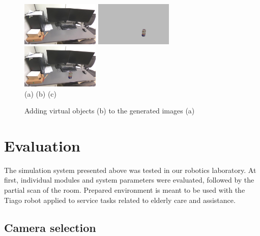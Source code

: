 \documentclass{svproc}
\begin{document}
\begin{figure}[!ht]
    \centering
        \includegraphics[width=0.33\textwidth,trim=29cm 2cm 0 10cm,clip]{img/gazebo_integration/sim.jpg}\hfill%
        \includegraphics[width=0.33\textwidth,trim=29cm 2cm 0 10cm,clip]{img/gazebo_integration/gazebo.jpg}\hfill%
        \includegraphics[width=0.33\textwidth,trim=29cm 2cm 0 10cm,clip]{img/gazebo_integration/sum.jpg}\\
        \hfill (a) \hfill\hfill (b) \hfill\hfill (c) \hfill~
    \caption{Adding virtual objects (b) to the generated images (a)}
    \label{fig:join}
    \vspace{-5mm}
\end{figure}


\section{Evaluation}
\label{sec:evaluation}

The simulation system presented above was tested in our robotics laboratory. At first, individual modules
and system parameters were evaluated, followed by the partial scan of the room. Prepared environment is 
meant to be used with the Tiago robot applied to service tasks related to elderly care and assistance.

\subsection{Camera selection}
\end{document}
